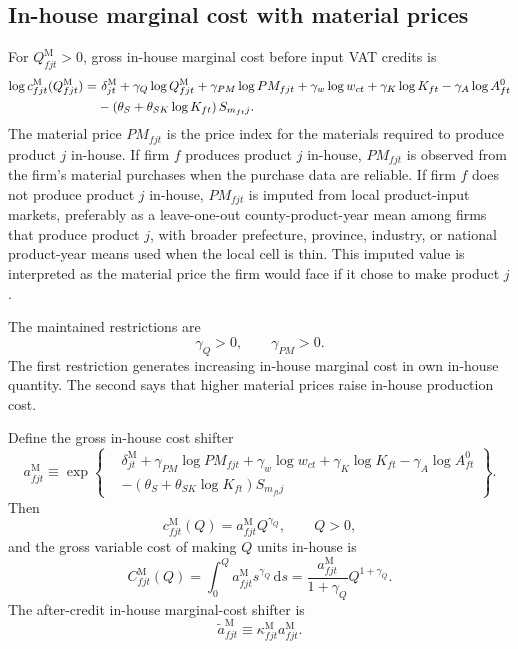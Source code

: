 \documentclass[11pt,a4paper]{article}
\newcommand{\M}{\mathrm{M}}
\newcommand{\dd}{\mathrm{d}}
\begin{document}
\subsection{In-house marginal cost with material prices}

For $Q^{\M}_{fjt}>0$, gross in-house marginal cost before input VAT credits is
\begin{align}
    \log c^{\M}_{fjt}(Q^{\M}_{fjt})
    =&\ \delta^{\M}_{jt}
    +\gamma_Q\log Q^{\M}_{fjt}
    +\gamma_{PM}\log PM_{fjt}
    +\gamma_w\log w_{ct}
    +\gamma_K\log K_{ft}
    -\gamma_A\log A^0_{ft} \notag\\
    &-\left(\theta_S+\theta_{SK}\log K_{ft}\right)S_{m_{ft}j}.
    \label{eq:mc_make_log}
\end{align}
The material price $PM_{fjt}$ is the price index for the materials required to produce product $j$ in-house. If firm $f$ produces product $j$ in-house, $PM_{fjt}$ is observed from the firm's material purchases when the purchase data are reliable. If firm $f$ does not produce product $j$ in-house, $PM_{fjt}$ is imputed from local product-input markets, preferably as a leave-one-out county-product-year mean among firms that produce product $j$, with broader prefecture, province, industry, or national product-year means used when the local cell is thin. This imputed value is interpreted as the material price the firm would face if it chose to make product $j$.

The maintained restrictions are
\begin{equation}
    \gamma_Q>0,
    \qquad
    \gamma_{PM}>0.
    \label{eq:gamma_restrictions}
\end{equation}
The first restriction generates increasing in-house marginal cost in own in-house quantity. The second says that higher material prices raise in-house production cost.

Define the gross in-house cost shifter
\begin{equation}
    a^{\M}_{fjt}
    \equiv
    \exp\left\{
    \begin{aligned}
        &\delta^{\M}_{jt}
        +\gamma_{PM}\log PM_{fjt}
        +\gamma_w\log w_{ct}
        +\gamma_K\log K_{ft}
        -\gamma_A\log A^0_{ft} \\
        &-\left(\theta_S+\theta_{SK}\log K_{ft}\right)S_{m_{ft}j}
    \end{aligned}
    \right\}.
    \label{eq:aM_def}
\end{equation}
Then
\begin{equation}
    c^{\M}_{fjt}(Q)=a^{\M}_{fjt}Q^{\gamma_Q},
    \qquad Q>0,
    \label{eq:mc_make_power}
\end{equation}
and the gross variable cost of making $Q$ units in-house is
\begin{equation}
    C^{\M}_{fjt}(Q)
    =\int_0^Q a^{\M}_{fjt}s^{\gamma_Q}\,\dd s
    =\frac{a^{\M}_{fjt}}{1+\gamma_Q}Q^{1+\gamma_Q}.
    \label{eq:make_var_cost}
\end{equation}
The after-credit in-house marginal-cost shifter is
\begin{equation}
    \widetilde a^{\M}_{fjt}\equiv \kappa^{\M}_{fjt}a^{\M}_{fjt}.
    \label{eq:aM_tilde}
\end{equation}
\end{document}
